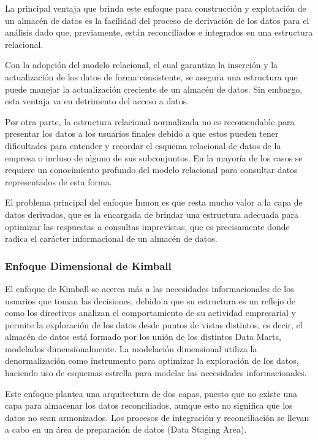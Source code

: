 La principal ventaja que brinda este enfoque para construcci\'on y explotaci\'on de un almacén de datos es la facilidad del proceso 
de derivaci\'on de los datos para el análisis dado que, previamente, est\'an reconciliados e integrados en una estructura relacional.

Con la adopci\'on del modelo relacional, el cual garantiza la inserci\'on y la actualización de los datos de forma consistente, se 
asegura una estructura que puede manejar la actualización creciente de un almacén de datos. Sin embargo, esta ventaja va en 
detrimento del acceso a datos. 

Por otra parte, la estructura relacional normalizada no es recomendable para presentar los datos a los usuarios finales debido 
a que estos pueden tener dificultades para entender y recordar el esquema relacional de datos de la empresa o incluso de alguno 
de sus subconjuntos. En la mayor\'ia de los casos se requiere un conocimiento profundo del modelo relacional para consultar 
datos representados de esta forma. 

El problema principal del enfoque Inmon es que resta mucho valor a la capa de datos derivados, que es la encargada de brindar 
una estructura adecuada para optimizar las respuestas a consultas imprevistas, que es precisamente donde radica el car\'acter 
informacional de un almacén de datos.

\subsubsection{Enfoque Dimensional de Kimball}

El enfoque de Kimball se acerca m\'as a las necesidades informacionales de los usuarios que toman las decisiones, debido a que su 
estructura es un reflejo de como los directivos analizan el comportamiento de su actividad empresarial y permite la exploraci\'on 
de los datos desde puntos de vistas distintos\cite{mijailmaster}, es decir, el almacén de datos est\'a formado por 
los uni\'on de los distintos Data Marts, modelados dimensionalmente. La modelación dimensional utiliza la denormalizaci\'on como 
instrumento para optimizar la exploraci\'on de los datos, haciendo uso de esquemas estrella para modelar las necesidades informacionales.

Este enfoque plantea una arquitectura de dos capas, puesto que no existe una capa para almacenar los datos reconciliados, aunque 
esto no significa que los datos no sean armonizados. Los procesos de integración y reconciliación se llevan a cabo en un \'area 
de preparaci\'on de datos (Data Staging Area). 

